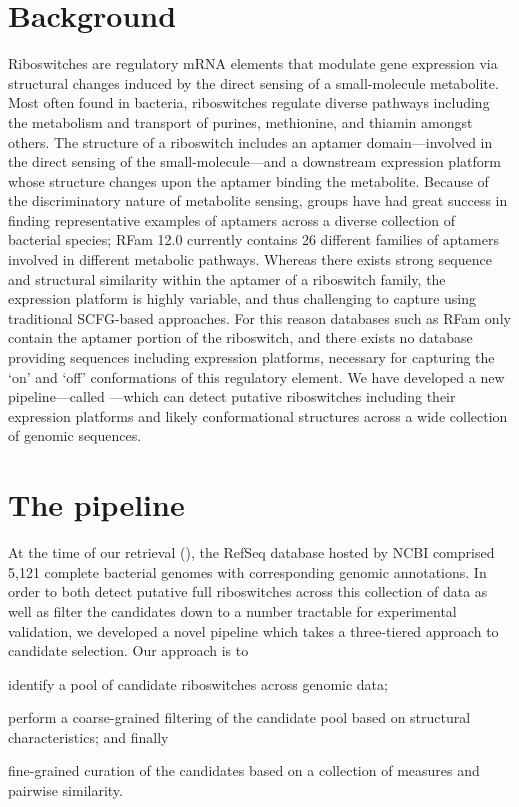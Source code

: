 \section{Background}
\label{sec:rfinder:bkgrnd}

Riboswitches are regulatory mRNA elements that modulate gene expression via structural changes induced by the direct sensing of a small-molecule metabolite. Most often found in bacteria, riboswitches regulate diverse pathways including the metabolism and transport of purines, methionine, and thiamin amongst others. The structure of a riboswitch includes an aptamer domain---involved in the direct sensing of the small-molecule---and a downstream expression platform whose structure changes upon the aptamer binding the metabolite. Because of the discriminatory nature of metabolite sensing, groups have had great success in finding representative examples of aptamers across a diverse collection of bacterial species; RFam 12.0 currently contains 26 different families of aptamers involved in different metabolic pathways. Whereas there exists strong sequence and structural similarity within the aptamer of a riboswitch family, the expression platform is highly variable, and thus challenging to capture using traditional SCFG-based approaches. For this reason databases such as RFam only contain the aptamer portion of the riboswitch, and there exists no database providing sequences including expression platforms, necessary for capturing the `on' and `off' conformations of this regulatory element. We have developed a new pipeline---called \rfinder---which can detect putative riboswitches including their expression platforms and likely conformational structures across a wide collection of genomic sequences.

\section{The \rfinder pipeline}
\label{sec:rfinder:pipeline}

At the time of our retrieval (\fnaRetrievalTime), the RefSeq database hosted by NCBI comprised 5,121 complete bacterial genomes with corresponding genomic annotations. In order to both detect putative full riboswitches across this collection of data as well as filter the candidates down to a number tractable for experimental validation, we developed a novel pipeline which takes a three-tiered approach to candidate selection. Our approach is to \begin{inparaenum}
\item identify a pool of candidate riboswitches across genomic data;
\item perform a coarse-grained filtering of the candidate pool based on structural characteristics; and finally
\item fine-grained curation of the candidates based on a collection of measures and pairwise similarity.
\end{inparaenum}

